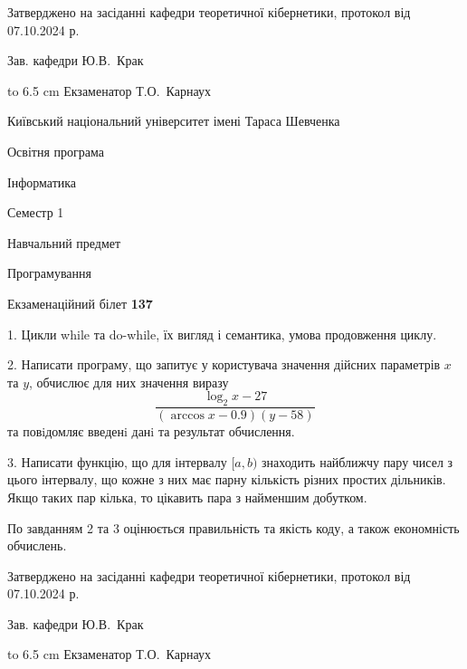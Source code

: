 \documentclass[12pt, ukrainian]{article}
\begin{document}
{\smallskip\smallskip \begin {scriptsize} Затверджено на засіданні кафедри теоретичної кібернетики, протокол   від   07.10.2024 р.\par\smallskip\smallskip\smallskip\smallskip
{\parbox {6.5 cm} {Зав. кафедри \dotfill Ю.В.~Крак}}\hspace {0.7cm} {\hbox to 6.5 cm { Екзаменатор \dotfill Т.О.~Карнаух}} \end{scriptsize}}
\vspace{0.9cm}
{{\begin {scriptsize}\par
{ \center  Київський національний університет імені Тараса Шевченка \par}
{\parbox {5 cm}{Освітня програма \hfill}{\parbox {7 cm}{Інформатика\hfill}}\parbox {6 cm}{\hfill Семестр 1}}\par
{\parbox {5 cm} {Навчальний предмет \hfill}\parbox {7 cm}{Програмування \hfill}\parbox {6cm}{\hfill}\par}\vspace{-15pt} \end{scriptsize}}{\center Екзаменаційний білет \No \textbf { 137 }\par}}
{%
1. Цикли while та do-while, їх вигляд і семантика, умова продовження циклу.%
\par
2. Написати програму, що запитує у користувача значення дійсних параметрів $x$ та $y$, обчислює для них значення виразу 
$$\frac{\log_{2} x - 27}{(\arccos x - 0.9) (y - 58)}$$ 
та повiдомляє введенi данi та результат обчислення.

\par
3. Написати функцію, що для інтервалу $[a, b)$ знаходить найближчу пару чисел з цього інтервалу, що кожне з них має парну кількість різних простих дільників. Якщо таких пар кілька, то цікавить пара з найменшим добутком.

По завданням 2 та 3 оцінюється правильність та якість коду, а також економність обчислень.

}
{\smallskip\smallskip \begin {scriptsize} Затверджено на засіданні кафедри теоретичної кібернетики, протокол   від   07.10.2024 р.\par\smallskip\smallskip\smallskip\smallskip
{\parbox {6.5 cm} {Зав. кафедри \dotfill Ю.В.~Крак}}\hspace {0.7cm} {\hbox to 6.5 cm { Екзаменатор \dotfill Т.О.~Карнаух}} \end{scriptsize}}
\vspace{0.9cm}
\end{document}
